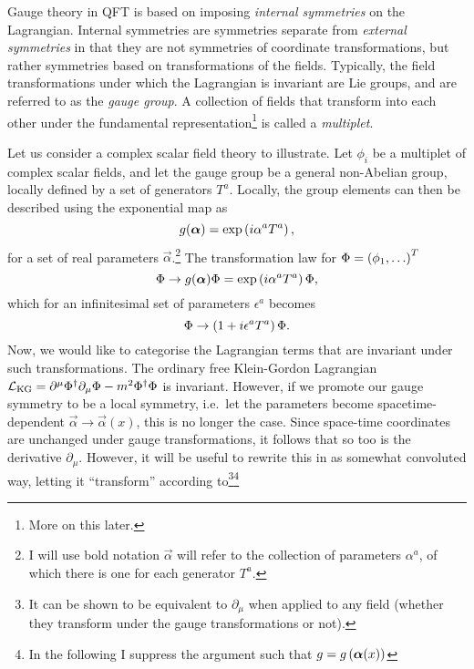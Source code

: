 \documentclass[../main.tex]{subfiles}
\begin{document}
Gauge theory in QFT is based on imposing \textit{internal symmetries} on the
Lagrangian. Internal symmetries are symmetries separate from \textit{external
    symmetries} in that they are not symmetries of coordinate transformations, but
rather symmetries based on transformations of the fields. Typically, the field
transformations under which the Lagrangian is invariant are Lie groups, and are
referred to as the \textit{gauge group}. A collection of fields that transform
into each other under the fundamental representation\footnote{More on this
    later.} is called a \textit{multiplet}.

Let us consider a complex scalar field theory to illustrate. Let \(\phi_i\) be
a multiplet of complex scalar fields, and let the gauge group be a general
non-Abelian group, locally defined by a set of generators \(T^a\). Locally, the
group elements can then be described using the exponential map as\needcite{}
\begin{equation}
    g(\boldsymbol{\alpha}) = \operatorname{exp}\left(i \alpha^a T^a\right),
\end{equation}
for a set of real parameters \(\vec{\alpha}\).\footnote{I will use bold notation \(\vec\alpha\) will refer to the collection of parameters \(\alpha^a\), of which there is one for each generator \(T^a\).}
The transformation law for \(\Phi = \left(\phi_1, \ldots\right)^T\)
\begin{equation}
    \label{qft:eq:gauge_transformation}
    \Phi \to g(\boldsymbol{\alpha}) \Phi = \operatorname{exp}\left(i \alpha^a T^a\right) \Phi,
\end{equation}
which for an infinitesimal set of parameters \(\epsilon^a\) becomes
\begin{equation}
    \Phi \to \left(1 + i \epsilon^a T^a\right) \Phi.
\end{equation}
\medskip
Now, we would like to categorise the Lagrangian terms that are invariant under such transformations.
The ordinary free Klein-Gordon Lagrangian \(\mathcal{L}_\text{KG} = \partial^\mu \Phi^\dagger \partial_\mu \Phi - m^2 \Phi^\dagger \Phi\) is invariant.
However, if we promote our gauge symmetry to be a local symmetry, i.e.\ let the parameters become spacetime-dependent \(\vec{\alpha} \to \vec{\alpha}(x)\), this is no longer the case.
Since space-time coordinates are unchanged under gauge transformations, it follows that so too is the derivative \(\partial_\mu\).
However, it will be useful to rewrite this in as somewhat convoluted way, letting it ``transform'' according to\footnote{It can be shown to be equivalent to \(\partial_\mu\) when applied to any field (whether they transform under the gauge transformations or not).}\footnote{In the following I suppress the argument such that \(g = g\left(\boldsymbol{\alpha}(x)\right)\)}
\end{document}

